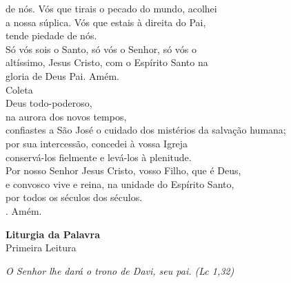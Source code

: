 \documentclass{book}
\begin{document}
\begin{flushleft}
    de nós. Vós que tirais o pecado do mundo, acolhei \\
    a nossa súplica. Vós que estais à direita do Pai, \\
    tende piedade de nós.
    \vspace{.2cm} \\
    Só vós sois o Santo, só vós o Senhor, só vós o \\
    altíssimo, Jesus Cristo, com o Espírito Santo na \\
    gloria de Deus Pai. Amém.
    \vspace{.2cm} \\
    \textcolor{VioletRed2}{Coleta}
    \vspace{.2cm} \\
    Deus todo-poderoso, \\
    na aurora dos novos tempos, \\
    confiastes a São José o cuidado dos mistérios da salvação humana; \\
    por sua intercessão, concedei à vossa Igreja \\
    conservá-los fielmente e levá-los à plenitude. \\
    Por nosso Senhor Jesus Cristo, vosso Filho, que é Deus, \\
    e convosco vive e reina, na unidade do Espírito Santo, \\
    por todos os séculos dos séculos. \\
    {\color{VioletRed2} \Rbar.} Amém. \\
\end{flushleft}
\begin{center}
    \textbf{Liturgia da Palavra}
    \vspace{.2cm}\\
    \textcolor{VioletRed2}{Primeira Leitura}
\end{center}
\begin{flushright}
    \textit{O Senhor lhe dará o trono de Davi, seu pai. (Lc 1,32)}
\end{flushright}
\end{document}
